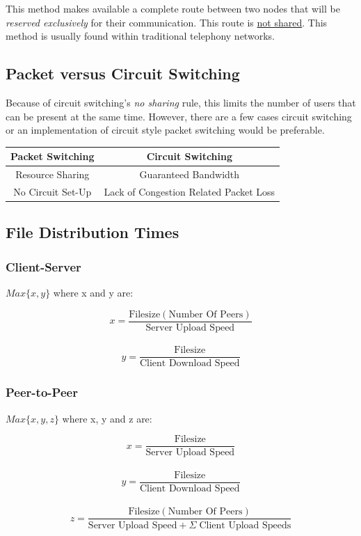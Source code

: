 \documentclass{article}
\begin{document}
This method makes available a complete route between two nodes that will be \textit{reserved exclusively} for their communication. This route is \underline{not shared}. This method is usually found within traditional telephony networks.

\subsection{Packet versus Circuit Switching}

Because of circuit switching's \textit{no sharing} rule, this limits the number of users that can be present at the same time. However, there are a few cases circuit switching or an implementation of circuit style packet switching would be preferable.

\begin{center}
  \begin{tabular}{|c|c|}
    \hline
    \textbf{Packet Switching} & \textbf{Circuit Switching}\\
    \hline \hline
    Resource Sharing & Guaranteed Bandwidth\\
    \hline
    No Circuit Set-Up & Lack of Congestion Related Packet Loss\\
    \hline
    
  \end{tabular}
\end{center}

\newpage
\subsection{File Distribution Times}
\subsubsection{Client-Server}

$Max\{x, y\}$ where x and y are:

\[x = \frac{\text{Filesize}(\text{Number Of Peers})}{\text{Server Upload Speed}}\]\\
\[y = \frac{\text{Filesize}}{\text{Client Download Speed}}\]

\subsubsection{Peer-to-Peer}

$Max\{x, y, z\}$ where x, y and z are:

\[x = \frac{\text{Filesize}}{\text{Server Upload Speed}}\]\\
\[y = \frac{\text{Filesize}}{\text{Client Download Speed}}\]\\
\[z = \frac{\text{Filesize}(\text{Number Of Peers})}{\text{Server Upload Speed} + \Sigma \; \text{Client Upload Speeds}}\]
\end{document}
